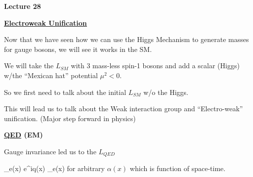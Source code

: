 



\thispagestyle{fancy}

\begin{center}
{\huge \textbf{Lecture 28}}
\end{center}

{\fontsize{14}{16}\selectfont

%
%
%
%
%
%
%
%
%
%
%
%

\textbf{\underline{\underline{Electroweak Unification}}}

Now that we have seen how we can use the Higgs Mechanism to generate masses for gauge bosons, we will see it works in the SM.

We will take the $L_{SM}$ with 3 mass-less spin-1 bosons and add a scalar (Higgs) w/the ``Mexican hat'' potential $\mu^2 < 0 $.

So we first need to talk about the initial $L_{SM}$ w/o the Higgs. 

This will lead us to talk about the Weak interaction group and ``Electro-weak'' unification. 
(Major step forward in physics) 

\textbf{\underline{\underline{QED}} (EM)}

Gauge invariance led us to the $L_{QED}$

\be
\psi_e(x) \rightarrow e^{iq\alpha(x)} \psi_e(x)
\ee
for arbitrary $\alpha(x)$ which is function of space-time.

}

